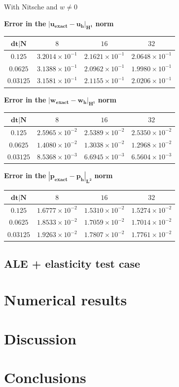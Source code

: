 \documentclass[11pt,a4paper,titlepage]{report}
\begin{document}
With Nitsche and $w \ne 0$

\begin{center}
\textbf{Error in the } $ \mathbf{ | u_{exact} - u_h |_{H^1}}$ \textbf{norm}
\begin{tabular}{| c | c | c | c |}
\hline
$\mathbf{dt | N}$ & $8$ & $16$ & $32$ \\
\hline
$ 0.125 $ & $3.2014 \times 10^{-1}$ & $2.1621 \times 10^{-1}$ &  $ 2.0648 \times 10^{-1}$ \\
\hline
$ 0.0625$ & $3.1388  \times 10^{-1}$ & $2.0962 \times 10^{-1}$ &  $ 1.9980  \times 10^{-1}$ \\
\hline
$ 0.03125 $ & $ 3.1581 \times 10^{-1}$ & $2.1155 \times 10^{-1}$ & $ 2.0206 \times 10^{-1}$ \\
\hline
\end{tabular}
\end{center}

\begin{center}
\textbf{Error in the } $ \mathbf{ | w_{exact} - w_h |_{H^1}}$ \textbf{norm}
\begin{tabular}{| c | c | c | c |}
\hline
$\mathbf{dt | N}$ & $8$ & $16$ & $32$ \\
\hline
$ 0.125 $ & $2.5965 \times 10^{-2}$ & $2.5389 \times 10^{-2}$ &  $ 2.5350 \times 10^{-2}$ \\
\hline
$ 0.0625$ & $1.4080  \times 10^{-2}$ & $1.3038 \times 10^{-2}$ &  $ 1.2968  \times 10^{-2}$ \\
\hline
$ 0.03125 $ & $ 8.5368 \times 10^{-3}$ & $6.6945 \times 10^{-3}$ & $ 6.5604 \times 10^{-3}$ \\
\hline
\end{tabular}
\end{center}

\begin{center}
\textbf{Error in the } $ \mathbf{ | p_{exact} - p_h |_{L^2}}$ \textbf{norm}
\begin{tabular}{| c | c | c | c |}
\hline
$\mathbf{dt | N}$ & $8$ & $16$ & $32$ \\
\hline
$ 0.125 $ & $1.6777 \times 10^{-2}$ & $1.5310 \times 10^{-2}$ &  $ 1.5274 \times 10^{-2}$ \\
\hline
$ 0.0625$ & $1.8533  \times 10^{-2}$ & $1.7059 \times 10^{-2}$ &  $ 1.7014  \times 10^{-2}$ \\
\hline
$ 0.03125 $ & $ 1.9263 \times 10^{-2}$ & $1.7807 \times 10^{-2}$ & $ 1.7761 \times 10^{-2}$ \\
\hline
\end{tabular}
\end{center}


\section{ALE + elasticity test case}

\chapter{Numerical results}

\chapter{Discussion}

\chapter{Conclusions}
\end{document}
